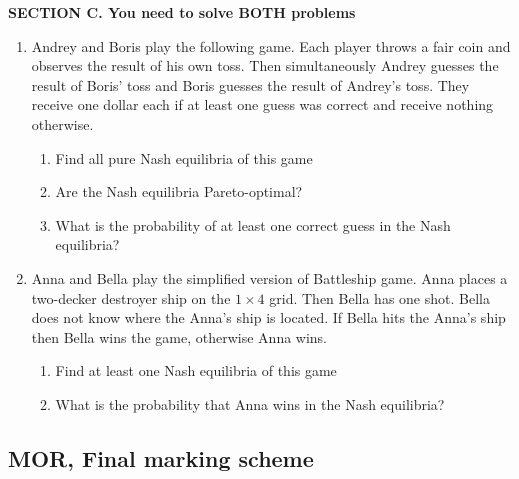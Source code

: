 \documentclass[12pt]{article} %
\theoremstyle{definition} %
\begin{document}
\textbf{SECTION C. You need to solve BOTH problems }

\begin{enumerate}[resume]

\item Andrey and Boris play the following game. Each player throws a fair coin and observes the result of his own toss. Then simultaneously Andrey guesses the result of Boris' toss and Boris guesses the result of Andrey's toss. They receive one dollar each if at least one guess was correct and receive nothing otherwise.

\begin{enumerate}
\item Find all pure Nash equilibria of this game
\item Are the Nash equilibria Pareto-optimal?
\item What is the probability of at least one correct guess in the Nash equilibria?
\end{enumerate}

\item Anna and Bella play the simplified version of Battleship game. Anna places a two-decker destroyer ship on the $1\times 4$ grid. Then Bella has one shot. Bella does not know where the Anna's ship is located. If Bella hits the Anna's ship then Bella wins the game, otherwise Anna wins.

\begin{enumerate}
\item Find at least one Nash equilibria of this game
\item What is the probability that Anna wins in the Nash equilibria?
\end{enumerate}


\end{enumerate}




\subsection{MOR, Final marking scheme}
\end{document}
